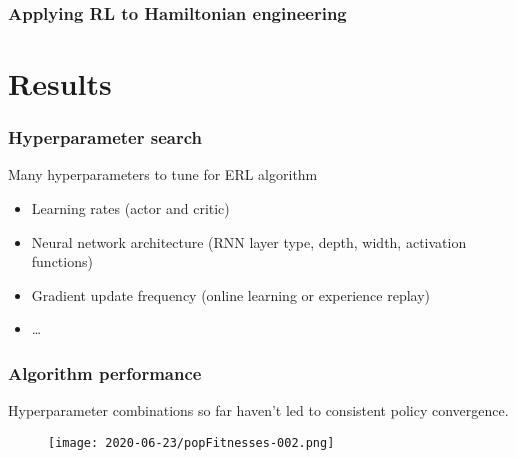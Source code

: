 \documentclass{beamer}
\begin{document}
\begin{frame}
\frametitle{Applying RL to Hamiltonian engineering}

\begin{table}
\label{tab:rl_ham}
\end{table}


\end{frame}

\section{Results}

\begin{frame}[allowframebreaks]
\frametitle{Hyperparameter search}

Many hyperparameters to tune for ERL algorithm
\begin{itemize}
    \item Learning rates (actor and critic)
    \item Neural network architecture (RNN layer type, depth, width, activation functions)
    \item Gradient update frequency (online learning or experience replay)
    \item \dots
\end{itemize}


\end{frame}

\begin{frame}
\frametitle{Algorithm performance}

Hyperparameter combinations so far haven't led to consistent policy convergence.
\begin{figure}
    \centering
    \texttt{[image: 2020-06-23/popFitnesses-002.png]}
    \label{fig:popFitnesses}
\end{figure}

\end{frame}
\end{document}
